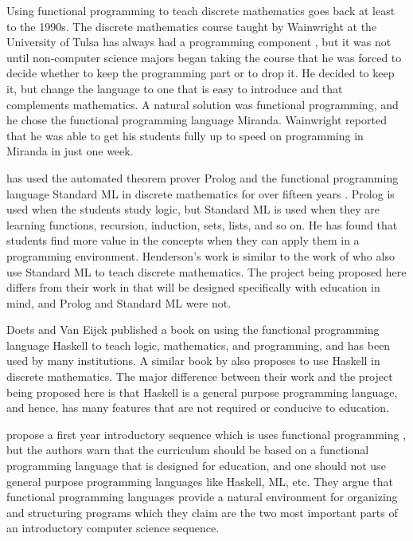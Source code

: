 Using functional programming to teach discrete mathematics goes back
at least to the 1990s.  The discrete mathematics course taught by
Wainwright at the University of Tulsa has always had a programming
component
\citep{Wainwright:1992}, but it was not until non-computer science
majors began taking the course that he was forced to decide whether to
keep the programming part or to drop it.  He decided to keep it, but
change the language to one that is easy to introduce and that
complements mathematics.  A natural solution was functional
programming, and he chose the functional programming language Miranda.
Wainwright reported that he was able to get his students fully up to
speed on programming in Miranda in just one week.

\citet{Henderson:2002} has used the automated theorem prover Prolog and the
functional programming language Standard ML in discrete mathematics
for over fifteen years .  Prolog is used when the students study
logic, but Standard ML is used when they are learning functions,
recursion, induction, sets, lists, and so on.  He has found that
students find more value in the concepts when they can apply them in a
programming environment.  Henderson's work is similar to the work
of \citet{Scharff:2002} who also use Standard ML to teach discrete
mathematics. The project being proposed here differs from their work
in that \thelang{} will be designed specifically with education in
mind, and Prolog and Standard ML were not.

Doets and Van Eijck published a book \citep{Doets:2004} on using the
functional programming language Haskell to teach logic, mathematics,
and programming, and has been used by many institutions.  A similar
book by \citet{ODonnell:2006} also proposes to use Haskell in discrete
mathematics. The major difference between their work and the project
being proposed here is that Haskell is a general purpose programming
language, and hence, has many features that are not required or
conducive to education.

\citet{FELLEISEN_FINDLER_FLATT_KRISHNAMURTHI_2004} propose a first year introductory sequence
which is uses functional programming , but the authors warn that the
curriculum should be based on a functional programming language that
is designed for education, and one should not use general purpose
programming languages like Haskell, ML, etc.  They argue that
functional programming languages provide a natural environment for
organizing and structuring programs which they claim are the two most
important parts of an introductory computer science sequence.

